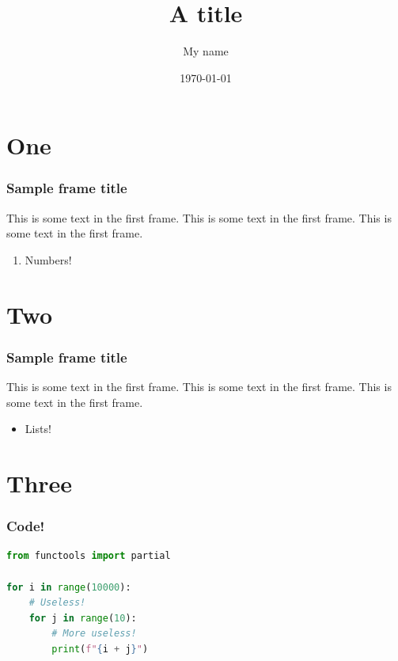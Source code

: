 \documentclass[compress]{beamer}
\title{A title}
\author{My name}
\institute{A very important degree}
\date{\today}
\begin{document}
	{
	\frame{\titlepage}}

	
	\section{One}
	\begin{frame}
		\frametitle{Sample frame title}
		This is some text in the first frame. This is some text in the first frame. This is some text in the first frame.
		\begin{enumerate}
				\item Numbers!
		\end{enumerate}
	\end{frame}
	\section{Two}
		\begin{frame}
		\frametitle{Sample frame title}
		This is some text in the first frame. This is some text in the first frame. This is some text in the first frame.
		\begin{itemize}
			\item Lists!
		\end{itemize}
	\end{frame}
	\section{Three}
	\begin{frame}[fragile]
		\frametitle{Code!}
			\begin{lstlisting}[language=Python]
from functools import partial

for i in range(10000):
	# Useless!
	for j in range(10):
		# More useless!
		print(f"{i + j}")\end{lstlisting}
	\end{frame}
	
\end{document}
